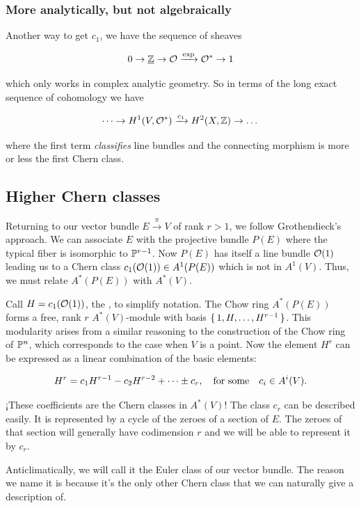 \documentclass[12pt]{memoir}
\begin{document}
\subsubsection{More analytically, but not algebraically}
Another way to get \(c_1\), we have the sequence of sheaves

\[0\to\underline{\mathbb{Z}}\to\mathcal{O}\xrightarrow{\exp}\mathcal{O}^\ast\to 1\]

which only works in complex analytic geometry. So in terms of the long exact sequence of cohomology we have

\[\dots\to H^1(V,\mathcal{O}^\ast)\xrightarrow{c_1}H^2(X,\mathbb{Z})\to\dots\]

where the first term \emph{classifies} line bundles and the connecting morphism is more or less the first Chern class.

\subsection{Higher Chern classes}

Returning to our vector bundle \(E\xrightarrow{\pi}V\) of rank \(r>1\), we follow Grothendieck's approach. We can associate \(E\) with the projective bundle \(P(E)\) where the typical fiber is isomorphic to \(\mathbb{P}^{r-1}\). Now \(P(E)\) has itself a line bundle \(\mathcal{O}(1)\) leading us to a Chern class \(c_1(\mathcal{O}(1))\in A^1(P(E))\) which is not in \(A^1(V)\). Thus, we must relate \(A^\ast(P(E))\) with \(A^\ast(V)\).\par
Call \(H=c_1(\mathcal{O}(1))\), the , to simplify notation. The Chow ring \(A^\ast(P(E))\) forms a free, rank \(r\) \(A^\ast(V)\)-module with basis \(\{\,1,H,\dots,H^{r-1}\,\}\). This modularity arises from a similar reasoning to the construction of the Chow ring of \(\mathbb{P}^n\), which corresponds to the case when \(V\) is a point. Now the element \(H^r\) can be expressed as a linear combination of the basic elements:

\[H^r=c_1H^{r-1}-c_2H^{r-2}+\dots\pm c_r,\quad\text{for some}\quad c_i\in A^i(V).\]

¡These coefficients are the Chern classes in \(A^\ast(V)\)! The class \(c_r\) can be described easily. It is represented by a cycle of the zeroes of a section of \(E\). The zeroes of that section will generally have codimension \(r\) and we will be able to represent it by \(c_r\).\par

Anticlimatically, we will call it the Euler class of our vector bundle. The reason we name it is because it's the only other Chern class that we can naturally give a description of.
\end{document}
